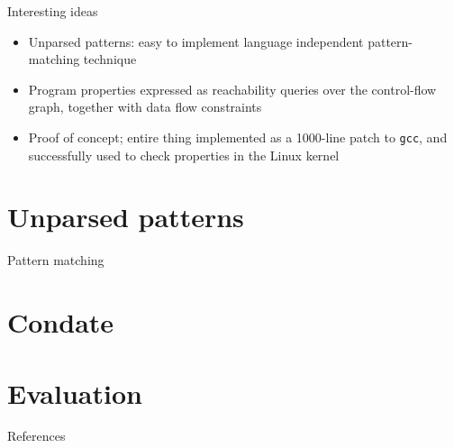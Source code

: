 \documentclass{beamer}
\begin{document}
\begin{frame}{Interesting ideas}
\begin{itemize}
\item Unparsed patterns: easy to implement language independent 
pattern-matching technique
\item Program properties expressed as reachability queries over the
control-flow graph, together with data flow constraints
\item Proof of concept; entire thing implemented as a 1000-line patch
to {\tt gcc}, and successfully used to check properties in the Linux kernel
\end{itemize}
\end{frame}

\section{Unparsed patterns}
\begin{frame}{Pattern matching}
\end{frame}
\section{Condate}
\section{Evaluation}

\begin{frame}{References}

{\footnotesize
}
\end{frame}
\end{document}
